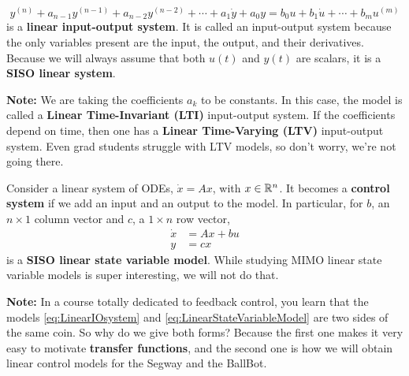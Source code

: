 \begin{tcolorbox}[colback=mylightblue, title = {\bf SISO Linear Systems}, breakable]

\begin{definition}
\label{def:LinearIOsystem} 
\begin{equation}
\label{eq:LinearIOsystem}
y^{(n)} + a_{n-1} y^{(n-1)} + a_{n-2} y^{(n-2)} +  \cdots +  a_1 \dot{y} + a_0 y = b_0 u + b_1 \dot{u} + \cdots + b_m u^{(m)}
\end{equation}
is a \textbf{linear input-output system}. It is called an input-output system because the only variables present are the input, the output, and their derivatives. Because we will always assume that both $u(t)$ and $y(t)$ are scalars, it is a \textbf{SISO linear system}.  \\
\end{definition}

\vspace*{.2cm}
\textbf{Note:} We are taking the coefficients $a_k$ to be constants. In this case, the model is called a \textbf{Linear Time-Invariant (LTI)} input-output system. If the coefficients depend on time, then one has a \textbf{Linear Time-Varying (LTV)} input-output system. Even grad students struggle with LTV models, so don't worry, we're not going there. 
\vspace*{.2cm}

\begin{definition}
\label{def:LinearStateVariableModel} 
Consider a linear system of ODEs, $\dot{x} = Ax$, with $x \in \mathbb R^n$. It becomes a \textbf{control system} if we add an input and an output to the model. In particular, for $b$, an $n \times 1$ column vector and $c$, a $1 \times n$ row vector, 
\begin{equation}
\label{eq:LinearStateVariableModel}
\begin{aligned}
    \dot{x} &= Ax + b u \\
    y &= c x
\end{aligned}
\end{equation}
is a \textbf{SISO linear state variable model}. While studying MIMO linear state variable models is super interesting, we will not do that. \\
\end{definition}

\textbf{Note:} In a course totally dedicated to feedback control, you learn that the models \eqref{eq:LinearIOsystem} and \eqref{eq:LinearStateVariableModel} are two sides of the same coin. So why do we give both forms? Because the first one makes it very easy to motivate \textbf{transfer functions}, and the second one is how we will obtain linear control models for the Segway and the BallBot. 



\end{tcolorbox}
